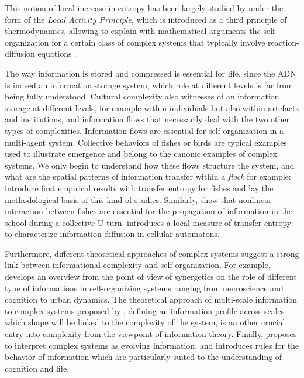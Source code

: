 This notion of local increase in entropy has been largely studied by  under the form of the \emph{Local Activity Principle}, which is introduced as a third principle of thermodynamics, allowing to explain with mathematical arguments the self-organization for a certain class of complex systems that typically involve reaction-diffusion equations~\cite{mainzer2013local}.


The way information is stored and compressed is essential for life, since the ADN is indeed an information storage system, which role at different levels is far from being fully understood. Cultural complexity also witnesses of an information storage at different levels, for example within individuals but also within artefacts and institutions, and information flows that necessarily deal with the two other types of complexities. Information flows are essential for self-organization in a multi-agent system. Collective behaviors of fishes or birds are typical examples used to illustrate emergence and belong to the canonic examples of complex systems. We only begin to understand how these flows structure the system, and what are the spatial patterns of information transfer within a \emph{flock} for example: \cite{crosato2017informative} introduce first empirical results with transfer entropy for fishes and lay the methodological basis of this kind of studies. Similarly, \cite{lecheval2018social} show that nonlinear interaction between fishes are essential for the propagation of information in the school during a collective U-turn. \cite{lizier2008local} introduces a local measure of transfer entropy to characterize information diffusion in cellular automatons.

Furthermore, different theoretical approaches of complex systems suggest a strong link between informational complexity and self-organization. For example, \cite{e18060197} develops an overview from the point of view of synergetics on the role of different type of informations in self-organizing systems ranging from neuroscience and cognition to urban dynamics. The theoretical approach of multi-scale information to complex systems proposed by \cite{allen2017multiscale}, defining an information profile across scales which shape will be linked to the complexity of the system, is an other crucial entry into complexity from the viewpoint of information theory. Finally, \cite{gershenson2012world} proposes to interpret complex systems as evolving information, and introduces rules for the behavior of information which are particularly suited to the understanding of cognition and life. 



